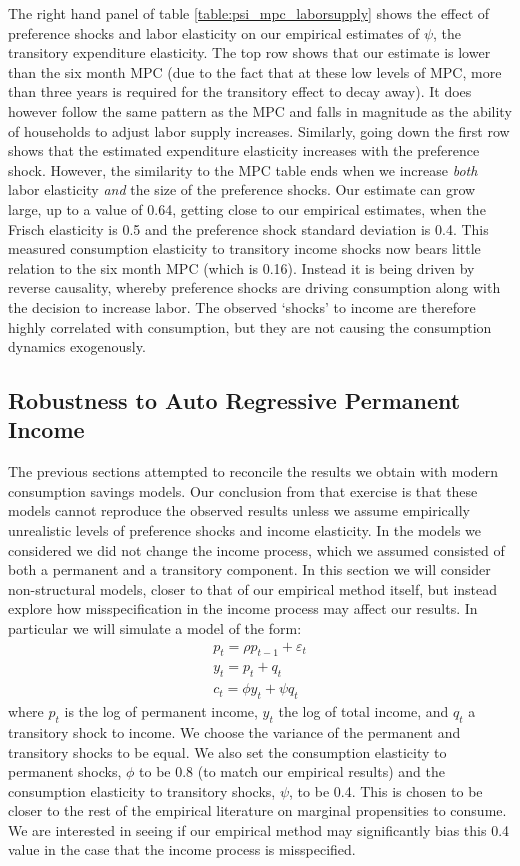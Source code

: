 \documentclass[titlepage]{\econtex}\newcommand{\texname}{IncomeUncertainty}
\begin{document}
The right hand panel of table \ref{table:psi_mpc_laborsupply} shows the effect of preference shocks and labor elasticity on our empirical estimates of $\psi$, the transitory expenditure elasticity. The top row shows that our estimate is lower than the six month MPC (due to the fact that at these low levels of MPC, more than three years is required for the transitory effect to decay away). It does however follow the same pattern as the MPC and falls in magnitude as the ability of households to adjust labor supply increases. Similarly, going down the first row shows that the estimated expenditure elasticity increases with the preference shock. However, the similarity to the MPC table ends when we increase \textit{both} labor elasticity \textit{and} the size of the preference shocks. Our estimate can grow large, up to a value of 0.64, getting close to our empirical estimates, when the Frisch elasticity is 0.5 and the preference shock standard deviation is 0.4. This measured consumption elasticity to transitory income shocks now bears little relation to the six month MPC (which is 0.16). Instead it is being driven by reverse causality, whereby preference shocks are driving consumption along with the decision to increase labor. The observed `shocks' to income are therefore highly correlated with consumption, but they are not causing the consumption dynamics exogenously.

\subsection{Robustness to Auto Regressive Permanent Income}
The previous sections attempted to reconcile the results we obtain with modern consumption savings models. Our conclusion from that exercise is that these models cannot reproduce the observed results unless we assume empirically unrealistic levels of preference shocks and income elasticity. In the models we considered we did not change the income process, which we assumed consisted of both a permanent and a transitory component. In this section we will consider non-structural models, closer to that of our empirical method itself, but instead explore how misspecification in the income process may affect our results. In particular we will simulate a model of the form:
\begin{align*}
p_{t} = \rho p_{t-1} + \varepsilon_{t} \\
y_t = p_t + q_t \\
c_{t} = \phi y_t + \psi q_t
\end{align*}
where $p_t$ is the log of permanent income, $y_t$ the log of total income, and $q_t$ a transitory shock to income. We choose the variance of the permanent and transitory shocks to be equal. We also set the consumption elasticity to permanent shocks, $\phi$ to be 0.8 (to match our empirical results) and the consumption elasticity to transitory shocks, $\psi$, to be 0.4. This is chosen to be closer to the rest of the empirical literature on marginal propensities to consume. We are interested in seeing if our empirical method may significantly bias this 0.4 value in the case that the income process is misspecified.
\end{document}
